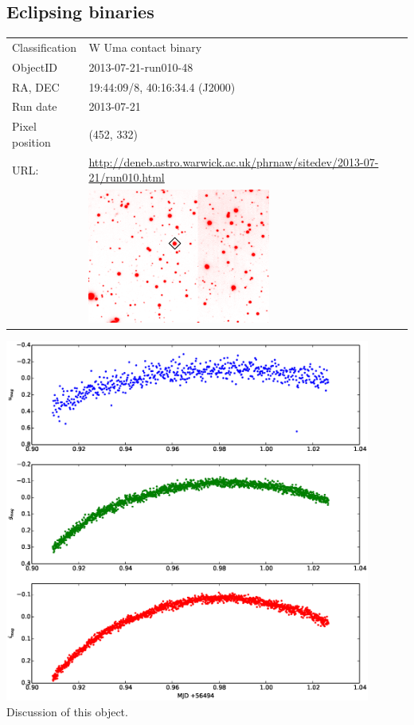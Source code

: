 \newpage
\subsection{Eclipsing binaries}

  \begin{tabular}{l l}
  Classification & W Uma contact binary \\
  ObjectID & 2013-07-21-run010-48 \\
  RA, DEC & 19:44:09/8, 40:16:34.4 (J2000) \\
  Run date & 2013-07-21 \\
  Pixel position & (452, 332) \\
  URL: & \small \url{http://deneb.astro.warwick.ac.uk/phrnaw/sitedev/2013-07-21/run010.html} \\
       & \includegraphics[width=60mm]{images/2013-07-21-run010-48.png} \\
  \end{tabular}
  \includegraphics[width=120mm]{images/2013-07-21-run010-48_lightcurve.eps} \\
  Discussion of this object.

